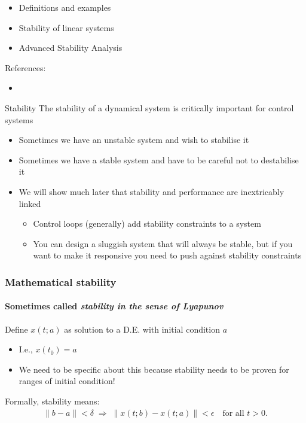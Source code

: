 \documentclass[10pt]{beamer-control}
\begin{document}

\begin{SUMMARY}
  \begin{itemize}
    \item Definitions and examples
    \item Stability of linear systems
    \item Advanced Stability Analysis
  \end{itemize}
  \vfill References:
  \begin{itemize}
    \item \astrom[§5.3]
  \end{itemize}
\end{SUMMARY}




\begin{frame}{Stability}
  The stability of a dynamical system is critically important for control systems
  \begin{itemize}
    \item Sometimes we have an unstable system and wish to stabilise it
    \item Sometimes we have a stable system and have to be careful not to destabilise it
    \item We will show much later that stability and performance are inextricably linked
      \begin{itemize}
        \item Control loops (generally) add stability constraints to a system
        \item You can design a sluggish system that will always be stable, but if you want to make it responsive you need to push against stability constraints
      \end{itemize}
  \end{itemize}
\end{frame}

\begin{frame}
  \frametitle{Mathematical stability}
  \framesubtitle{Sometimes called \emph{stability in the sense of Lyapunov}}
  Define $x(t;a)$ as solution to a D.E. with initial condition $a$
  \begin{itemize}
    \item I.e., $x(t_0) = a$
    \item We need to be specific about this because stability needs to be proven for ranges of initial condition!
  \end{itemize}
  Formally, stability means:
  \begin{align}
    \|b - a\| < \delta \;\Rightarrow\; \|x(t; b) - x(t; a)\| < \epsilon \quad \text{for all } t > 0.
  \end{align}
\end{frame}
\end{document}
